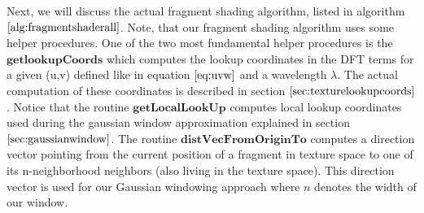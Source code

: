 \label{sec:proceduresdescripton}
Next, we will discuss the actual fragment shading algorithm, listed in algorithm $\ref{alg:fragmentshaderall}$. Note, that our fragment shading algorithm uses some helper procedures. One of the two most fundamental helper procedures is the $\textbf{getlookupCoords}$ which computes the lookup coordinates in the DFT terms for a given (u,v) defined like in equation $\ref{eq:uvw}$ and a wavelength $\lambda$. The actual computation of these coordinates is described in section $\ref{sec:texturelookupcoords}$. Notice that the routine $\textbf{getLocalLookUp}$ computes local lookup coordinates used during the gaussian window approximation explained in section $\ref{sec:gaussianwindow}$. The routine $\textbf{distVecFromOriginTo}$ computes a direction vector pointing from the current position of a fragment in texture space to one of its n-neighborhood neighbors (also living in the texture space). This direction vector is used for our Gaussian windowing approach where $n$ denotes the width of our window. 

